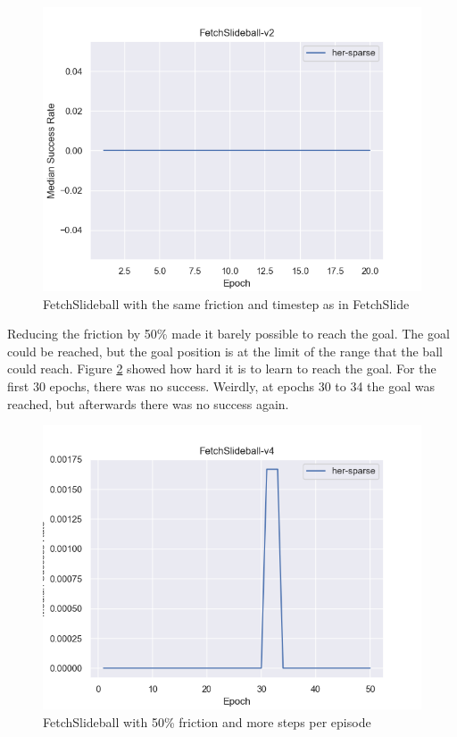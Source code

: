 \begin{figure} [h]
	
	\centering
	\includegraphics[width=1\textwidth]{figures/fig_FetchSlideball-v2.png}
	\caption{FetchSlideball with the same friction and timestep as in FetchSlide}
	\label{slideball2}
\end{figure}

Reducing the friction by 50\% made it barely possible to reach the goal. The goal could be reached, but the goal position is at the limit of the range that the ball could reach. Figure \ref{slideball3} showed how hard it is to learn to reach the goal. For the first 30 epochs, there was no success. Weirdly, at epochs 30 to 34 the goal was reached, but afterwards there was no success again. 

\begin{figure} [h]
	
	\centering
	\includegraphics[width=1\textwidth]{figures/fig_FetchSlideball-v4.png}
	\caption{FetchSlideball with 50\% friction and more steps per episode}
	\label{slideball3}
\end{figure}

